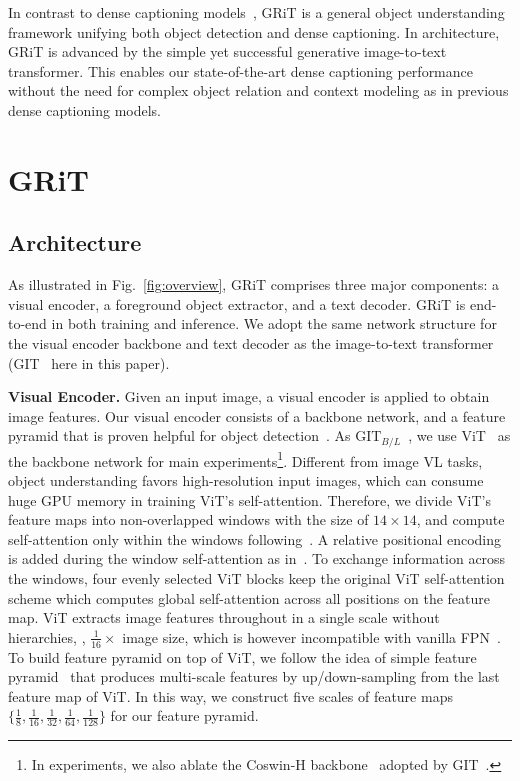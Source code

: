 \documentclass[10pt,twocolumn,letterpaper]{article}
\newcommand{\myparagraph}[1]{{\vspace{0.5em} \noindent \bf #1}}
\begin{document}
In contrast to dense captioning models~\cite{johnson2016densecap,yang2017dense,li2019learning,yin2019context,shao2022region}, GRiT is a general object understanding framework unifying both object detection and dense captioning. In architecture, GRiT is advanced by the simple yet successful generative image-to-text transformer. This enables our state-of-the-art dense captioning performance without the need for complex object relation and context modeling as in previous dense captioning models.

\section{GRiT}
\label{sec:grit}
\subsection{Architecture}
As illustrated in Fig.~\ref{fig:overview}, GRiT comprises three major components: a visual encoder, a foreground object extractor, and a text decoder. GRiT is end-to-end in both training and inference. We adopt the same network structure for the visual encoder backbone and text decoder as the image-to-text transformer (GIT~\cite{wang2022git} here in this paper).

\myparagraph{Visual Encoder.} Given an input image, a visual encoder is applied to obtain image features. Our visual encoder consists of a backbone network, and a feature pyramid that is proven helpful for object detection~\cite{li2022exploring, lin2017feature}. As GIT$_{B/L}$~\cite{wang2022git}, we use ViT~\cite{dosovitskiy2020image} as the backbone network for main experiments\footnote{In experiments, we also ablate the Coswin-H backbone~\cite{yuan2021florence} adopted by GIT~\cite{wang2022git}.}. Different from image VL tasks, object understanding favors high-resolution input images, which can consume huge GPU memory in training ViT's self-attention. Therefore, we divide ViT's feature maps into non-overlapped windows with the size of $14\times14$, and compute self-attention only within the windows following~\cite{li2022exploring}. A relative positional encoding is added during the window self-attention as in~\cite{liu2021swin}. To exchange information across the windows, four evenly selected ViT blocks keep the original ViT self-attention scheme which computes global self-attention across all positions on the feature map. ViT extracts image features throughout in a single scale without hierarchies, \eg, $\frac{1}{16}\times$ image size, which is however incompatible with vanilla FPN~\cite{lin2017feature}. To build feature pyramid on top of ViT, we follow the idea of simple feature pyramid~\cite{li2022exploring} that produces multi-scale features by up/down-sampling from the last feature map of ViT. In this way, we construct five scales of feature maps $\{\frac{1}{8},\frac{1}{16},\frac{1}{32},\frac{1}{64},\frac{1}{128}\}$ for our feature pyramid.
\end{document}
